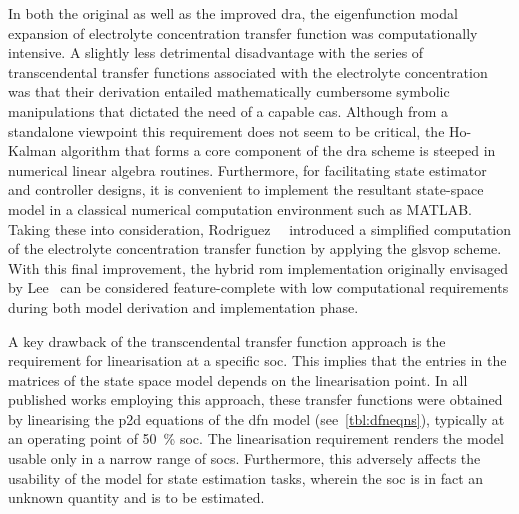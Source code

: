 In both the original as well  as the improved \gls{dra}, the eigenfunction modal
expansion  of electrolyte  concentration transfer  function was  computationally
intensive.  A  slightly  less  detrimental   disadvantage  with  the  series  of
transcendental transfer functions associated  with the electrolyte concentration
was   that  their   derivation  entailed   mathematically  cumbersome   symbolic
manipulations that  dictated the need  of a  capable \gls{cas}. Although  from a
standalone  viewpoint  this  requirement  does  not seem  to  be  critical,  the
\mbox{Ho-Kalman}  algorithm  that  forms  a  core  component  of  the  \gls{dra}
scheme  is  steeped  in  numerical linear  algebra  routines.  Furthermore,  for
facilitating  state  estimator  and  controller designs,  it  is  convenient  to
implement the resultant  state-space model in a  classical numerical computation
environment   such  as   \textsc{MATLAB}.  Taking   these  into   consideration,
Rodriguez~\etal{}~\cite{Rodriguez2017}  introduced a  simplified computation  of
the  electrolyte  concentration  transfer  function  by  applying  the  gls{vop}
scheme.  With  this  final  improvement,  the  hybrid  \gls{rom}  implementation
originally envisaged by Lee~\etal{} can  be considered feature-complete with low
computational  requirements  during  both model  derivation  and  implementation
phase.


A  key  drawback  of  the  transcendental  transfer  function  approach  is  the
requirement for  linearisation at  a specific \gls{soc}.  This implies  that the
entries in  the matrices of the  state space model depends  on the linearisation
point. In all published works  employing this approach, these transfer functions
were  obtained by  linearising the  \gls{p2d} equations  of the  \gls{dfn} model
(see~\cref{tbl:dfneqns}), typically  at an operating point  of \SI{50}{\percent}
\gls{soc}.  The linearisation  requirement renders  the model  usable only  in a
narrow range of  \glspl{soc}. Furthermore, this adversely  affects the usability
of the  model for state  estimation tasks, wherein the  \gls{soc} is in  fact an
unknown quantity and is to be estimated.


